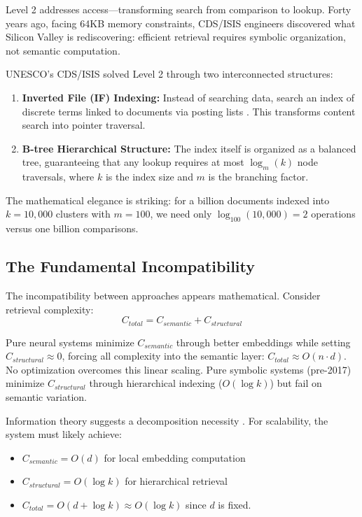 \documentclass[manuscript,screen,nonacm]{acmart}
\begin{document}
Level 2 addresses access---transforming search from comparison to lookup. Forty years ago, facing 64KB memory constraints, CDS/ISIS engineers discovered what Silicon Valley is rediscovering: efficient retrieval requires symbolic organization, not semantic computation.

UNESCO's CDS/ISIS solved Level 2 through two interconnected structures:
\begin{enumerate}
    \item \textbf{Inverted File (IF) Indexing:} Instead of searching data, search an index of discrete terms linked to documents via posting lists \cite{zobel2006}. This transforms content search into pointer traversal.
    \item \textbf{B-tree Hierarchical Structure:} The index itself is organized as a balanced tree, guaranteeing that any lookup requires at most $\log_m(k)$ node traversals, where $k$ is the index size and $m$ is the branching factor.
\end{enumerate}

The mathematical elegance is striking: for a billion documents indexed into $k=10,000$ clusters with $m=100$, we need only $\log_{100}(10,000) = 2$ operations versus one billion comparisons.

\subsection{The Fundamental Incompatibility}

The incompatibility between approaches appears mathematical. Consider retrieval complexity:
\[ C_{total} = C_{semantic} + C_{structural} \]

Pure neural systems minimize $C_{semantic}$ through better embeddings while setting $C_{structural} \approx 0$, forcing all complexity into the semantic layer: $C_{total} \approx O(n \cdot d)$. No optimization overcomes this linear scaling. Pure symbolic systems (pre-2017) minimize $C_{structural}$ through hierarchical indexing ($O(\log k)$) but fail on semantic variation.

Information theory suggests a decomposition necessity \cite{chen2025}. For scalability, the system must likely achieve:
\begin{itemize}
    \item $C_{semantic} = O(d)$ for local embedding computation
    \item $C_{structural} = O(\log k)$ for hierarchical retrieval
    \item $C_{total} = O(d + \log k) \approx O(\log k)$ since $d$ is fixed.
\end{itemize}
\end{document}
